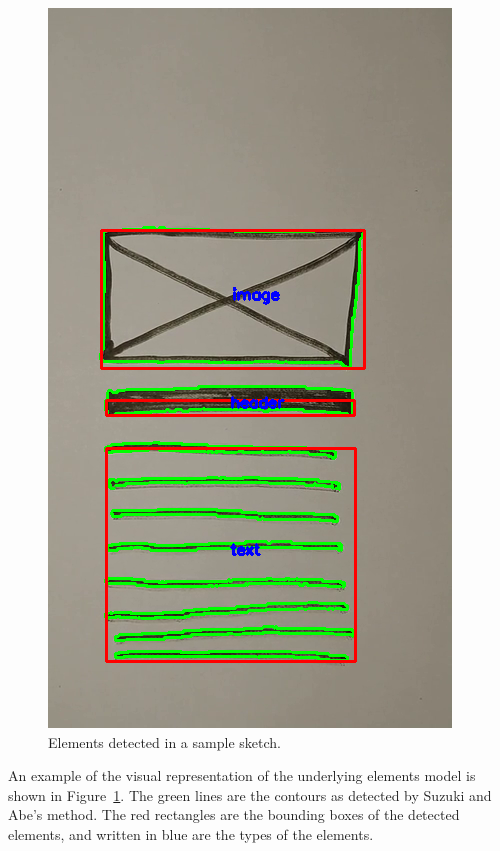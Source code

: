 \documentclass[]{IEEEtran}
\begin{document}
  \begin{figure}[h]
    \includegraphics[width=\linewidth]{./figures/elements_000420.png}
    \caption{Elements detected in a sample sketch.}
    \label{fig:detection}
  \end{figure}

  An example of the visual representation of the underlying elements model is shown in Figure~\ref{fig:detection}. The green lines are the contours as detected by Suzuki and Abe's method. The red rectangles are the bounding boxes of the detected elements, and written in blue are the types of the elements.
\end{document}
